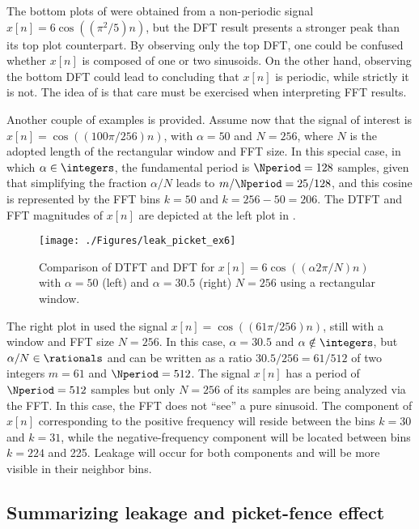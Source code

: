 The bottom plots of  were obtained from a non-periodic signal $x[n]=6\cos((\pi^2 / 5) n)$, but the DFT 
result presents a stronger peak than its top plot counterpart. By observing only the top DFT, one could be confused
whether $x[n]$ is composed of one or two sinusoids. On the other hand, observing the bottom DFT could lead to
concluding that $x[n]$ is periodic, while strictly it is not.
The idea of  is that care must be exercised when interpreting FFT results.

Another couple of examples is provided. Assume now that the signal of interest is $x[n] = \cos( (100 \pi / 256) n)$, with $\alpha=50$ and $N=256$, where $N$ is the adopted length of the rectangular window and FFT size. In this special case, in which $\alpha \in \integers$, the fundamental period is $\Nperiod = 128$ samples, given that simplifying the fraction $\alpha / N$ leads to $m/\Nperiod = 25/128$, and this cosine is represented by the FFT bins $k=50$ and $k=256-50=206$. The DTFT and FFT magnitudes of $x[n]$ are depicted at the left plot in .

\begin{figure}[htbp]
\centering
\texttt{[image: ./Figures/leak\_picket\_ex6]}
\caption{Comparison of DTFT and DFT for $x[n]=6\cos((\alpha 2 \pi /N) n)$ with $\alpha=50$ (left) and $\alpha=30.5$ (right) $N=256$ using a rectangular window.\label{fig:leak_picket_ex6}}
\end{figure}

The right plot in  used the signal $x[n] = \cos( (61 \pi / 256) n)$, still with a window and FFT size $N=256$. In this case, $\alpha = 30.5$ and $\alpha \notin \integers$, but $\alpha/N \in \rationals$ and can be written as a ratio $30.5/256 = 61/512$ of two integers $m=61$ and $\Nperiod=512$. The signal $x[n]$ has a period of $\Nperiod=512$ samples but only $N=256$ of its samples are being analyzed via the FFT. In this case, the FFT does not ``see'' a pure sinusoid. The component of $x[n]$ corresponding to the positive frequency will reside between the bins $k=30$ and $k=31$, while the negative-frequency component will be located between bins $k=224$ and 225. Leakage will occur for both components and will be more visible in their neighbor bins.

\subsection{Summarizing leakage and picket-fence effect}

